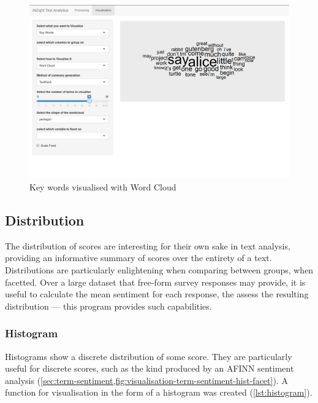 \message{ !name(jason-cairns-dissertation.tex)}\documentclass[11pt, a4paper, titlepage]{report}
\begin{document}
\begin{figure}
\centering
\includegraphics[scale=0.35]{visualisation-keywords-wordcloud.png}
\caption{Key words visualised with Word Cloud\label{fig:visualisation-keywords-wordcloud}}
\end{figure}

\subsection{Distribution}\label{sec:distribution}

The distribution of scores are interesting for their own sake in text
analysis, providing an informative summary of scores over the
entirety of a text. Distributions are particularly enlightening when
comparing between groups, when facetted. Over a large dataset that
free-form survey responses may provide, it is useful to calculate the
mean sentiment for each response, the assess the resulting
distribution --- this program provides such capabilities.

\subsubsection{Histogram}\label{sec:histogram}

Histograms show a discrete distribution of some score. They are
particularly useful for discrete scores, such as the kind produced by
an AFINN sentiment analysis (\cref{sec:term-sentiment,fig:visualisation-term-sentiment-hist-facet}). A
function for visualisation in the form of a histogram was created
(\cref{lst:histogram}).
\end{document}
